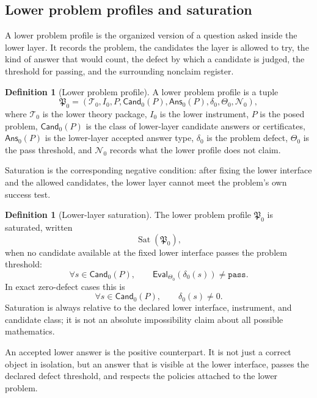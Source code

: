 \documentclass[11pt]{article}
\theoremstyle{definition}
\newtheorem{definition}[theorem]{Definition}
\begin{document}
\subsection{Lower problem profiles and saturation}
\label{subsec:layers-profiles-saturation}

A lower problem profile is the organized version of a question asked inside
the lower layer.  It records the problem, the candidates the layer is allowed
to try, the kind of answer that would count, the defect by which a candidate is
judged, the threshold for passing, and the surrounding nonclaim register.

\begin{definition}[Lower problem profile]
\label{def:sau-lower-profile}
A lower problem profile is a tuple
\[
\mathfrak P_0=(\mathcal T_0,I_0,P,\mathsf{Cand}_0(P),\mathsf{Ans}_0(P),
\delta_0,\Theta_0,\mathcal N_0),
\]
where \(\mathcal T_0\) is the lower theory package, \(I_0\) is the lower instrument, \(P\) is the posed problem, \(\mathsf{Cand}_0(P)\) is the class of lower-layer candidate answers or certificates, \(\mathsf{Ans}_0(P)\) is the lower-layer accepted answer type, \(\delta_0\) is the problem defect, \(\Theta_0\) is the pass threshold, and \(\mathcal N_0\) records what the lower profile does not claim.
\end{definition}

Saturation is the corresponding negative condition: after fixing the lower
interface and the allowed candidates, the lower layer cannot meet the problem's
own success test.

\begin{definition}[Lower-layer saturation]
\label{def:sau-saturation}
The lower problem profile \(\mathfrak P_0\) is saturated, written
\[
\operatorname{Sat}(\mathfrak P_0),
\]
when no candidate available at the fixed lower interface passes the problem threshold:
\[
\forall s\in\mathsf{Cand}_0(P),\qquad
\mathsf{Eval}_{\Theta_0}(\delta_0(s))\neq\texttt{pass}.
\]
In exact zero-defect cases this is
\[
\forall s\in\mathsf{Cand}_0(P),\qquad \delta_0(s)\neq 0.
\]
Saturation is always relative to the declared lower interface, instrument, and candidate class; it is not an absolute impossibility claim about all possible mathematics.
\end{definition}

An accepted lower answer is the positive counterpart.  It is not just a correct
object in isolation, but an answer that is visible at the lower interface,
passes the declared defect threshold, and respects the policies attached to
the lower problem.
\end{document}
